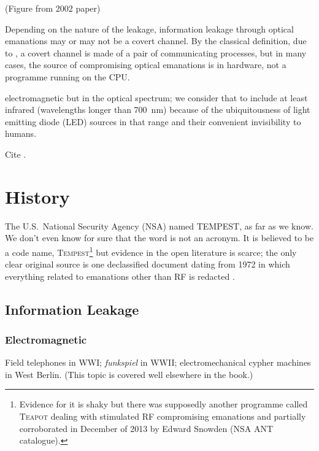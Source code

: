 \documentclass[a4paper,twoside,11pt]{book}
\begin{document}
(Figure from 2002 paper)

Depending on the nature of the leakage, information leakage through optical
emanations may or may not be a covert channel. By the classical definition,
due to \cite{Lampson1973}, a covert channel is made of a pair of communicating
processes, but in many cases, the source of compromising optical emanations
is in hardware, not a programme running on the CPU.

electromagnetic but in the optical spectrum; we consider that to include at
least infrared (wavelengths longer than \SI{700}{\nano\metre}) because of the
ubiquitousness of light emitting diode (LED) sources in that range and their
convenient invisibility to humans.

Cite \cite{Allain2019}.

\section{History}
The U.S.\ National Security Agency (NSA) named TEMPEST, as far as we know. We
don't even know for sure that the word is not an acronym. It is believed to
be a code name, \textsc{Tempest}\footnote{Evidence for it is shaky but there
was supposedly another programme called \textsc{Teapot} dealing with
stimulated RF compromising emanations \cite[p.~539]{Anderson2008a} and
partially corroborated in December of 2013 by Edward Snowden (NSA ANT
catalogue).} but evidence in the open literature is scarce; the only clear
original source is one declassified document dating from 1972 in which
everything related to emanations other than RF is redacted
\cite{NSAtempest2007}.
\subsection{Information Leakage}
\subsubsection{Electromagnetic}
Field telephones in WWI; \emph{funkspiel} in WWII; electromechanical cypher
machines in West Berlin. (This topic is covered well elsewhere in the book.)

\end{document}
